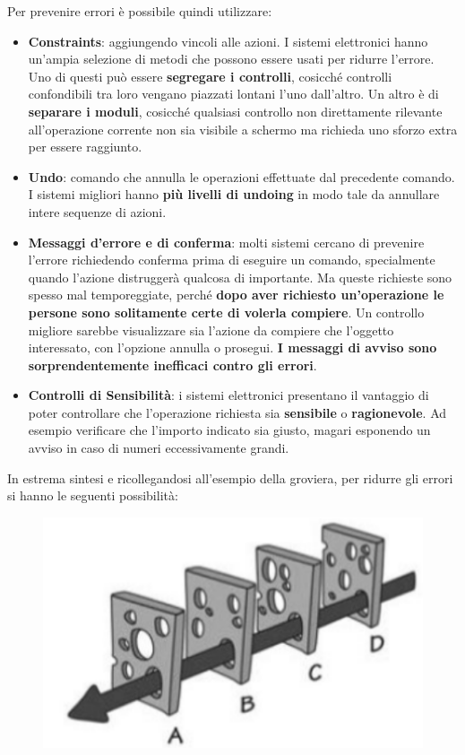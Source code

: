\documentclass[a4paper,11pt,oneside]{book}
\begin{document}
Per prevenire errori è possibile quindi utilizzare:
\begin{itemize}
	\item \textbf{Constraints}: aggiungendo vincoli alle azioni. I sistemi elettronici hanno un'ampia selezione di metodi che possono essere usati per ridurre l'errore. Uno di questi può essere \textbf{segregare i controlli}, cosicché controlli confondibili tra loro vengano piazzati lontani l'uno dall'altro. Un altro è di \textbf{separare i moduli}, cosicché qualsiasi controllo non direttamente rilevante all'operazione corrente non sia visibile a schermo ma richieda uno sforzo extra per essere raggiunto.
	\item \textbf{Undo}: comando che annulla le operazioni effettuate dal precedente comando. I sistemi migliori hanno \textbf{più livelli di undoing} in modo tale da annullare intere sequenze di azioni.
	\item \textbf{Messaggi d'errore e di conferma}: molti sistemi cercano di prevenire l'errore richiedendo conferma prima di eseguire un comando, specialmente quando l'azione distruggerà qualcosa di importante. Ma queste richieste sono spesso mal temporeggiate, perché \textbf{dopo aver richiesto un'operazione le persone sono solitamente certe di volerla compiere}. Un controllo migliore sarebbe visualizzare sia l'azione da compiere che l'oggetto interessato, con l'opzione annulla o prosegui.\textbf{ I messaggi di avviso sono sorprendentemente inefficaci contro gli errori}.

	\item  \textbf{Controlli di Sensibilità}: i sistemi elettronici presentano il vantaggio di poter controllare che l'operazione richiesta sia \textbf{sensibile} o \textbf{ragionevole}. Ad esempio verificare che l'importo indicato sia giusto, magari esponendo un avviso in caso di numeri eccessivamente grandi.
\end{itemize}

In estrema sintesi e ricollegandosi all'esempio della groviera, per ridurre gli errori si hanno le seguenti possibilità:

\begin{figure}[!h]
	\centering
	\includegraphics[scale=0.5]{immagini/Groviera.png}
\end{figure}
\end{document}
